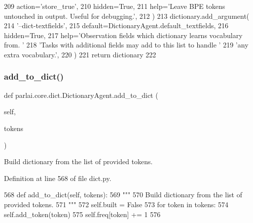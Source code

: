 \begin{DoxyCode}
209             action=\textcolor{stringliteral}{'store\_true'},
210             hidden=\textcolor{keyword}{True},
211             help=\textcolor{stringliteral}{'Leave BPE tokens untouched in output. Useful for debugging.'},
212         )
213         dictionary.add\_argument(
214             \textcolor{stringliteral}{'--dict-textfields'},
215             default=DictionaryAgent.default\_textfields,
216             hidden=\textcolor{keyword}{True},
217             help=\textcolor{stringliteral}{'Observation fields which dictionary learns vocabulary from. '}
218             \textcolor{stringliteral}{'Tasks with additional fields may add to this list to handle '}
219             \textcolor{stringliteral}{'any extra vocabulary.'},
220         )
221         \textcolor{keywordflow}{return} dictionary
222 
\end{DoxyCode}
\mbox{\label{classparlai_1_1core_1_1dict_1_1DictionaryAgent_acb28700c8c2725c05a8f3e28f11f8714}} 
\subsubsection{\texorpdfstring{add\+\_\+to\+\_\+dict()}{add\_to\_dict()}}
{\footnotesize\ttfamily def parlai.\+core.\+dict.\+Dictionary\+Agent.\+add\+\_\+to\+\_\+dict (\begin{DoxyParamCaption}\item[{}]{self,  }\item[{}]{tokens }\end{DoxyParamCaption})}

\begin{DoxyVerb}Build dictionary from the list of provided tokens.
\end{DoxyVerb}
 

Definition at line 568 of file dict.\+py.


\begin{DoxyCode}
568     \textcolor{keyword}{def }add\_to\_dict(self, tokens):
569         \textcolor{stringliteral}{"""}
570 \textcolor{stringliteral}{        Build dictionary from the list of provided tokens.}
571 \textcolor{stringliteral}{        """}
572         self.built = \textcolor{keyword}{False}
573         \textcolor{keywordflow}{for} token \textcolor{keywordflow}{in} tokens:
574             self.add\_token(token)
575             self.freq[token] += 1
576 
\end{DoxyCode}
\mbox{\label{classparlai_1_1core_1_1dict_1_1DictionaryAgent_aec44508e4b501214618e24d86a4a51df}} 
